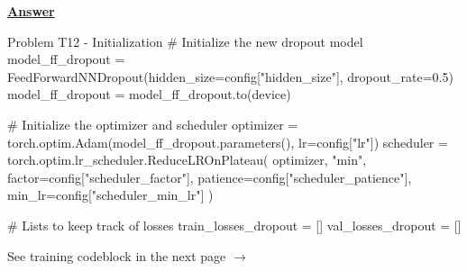 \documentclass[12pt, a4paper]{article}
\begin{document}
            \vspace{1em}

            \noindent \underline{\textbf{Answer}}

            \vspace{0.25em}

            \begin{codeblock}{Problem T12 - Initialization}
                # Initialize the new dropout model
                model_ff_dropout = FeedForwardNNDropout(hidden_size=config["hidden_size"], dropout_rate=0.5)
                model_ff_dropout = model_ff_dropout.to(device)

                # Initialize the optimizer and scheduler
                optimizer = torch.optim.Adam(model_ff_dropout.parameters(), lr=config["lr"])
                scheduler = torch.optim.lr_scheduler.ReduceLROnPlateau(
                    optimizer, "min", 
                    factor=config["scheduler_factor"],
                    patience=config["scheduler_patience"],
                    min_lr=config["scheduler_min_lr"]
                )

                # Lists to keep track of losses
                train_losses_dropout = []
                val_losses_dropout = []
            \end{codeblock}
			See training codeblock in the next page $\rightarrow$

	\pagebreak
\end{document}
